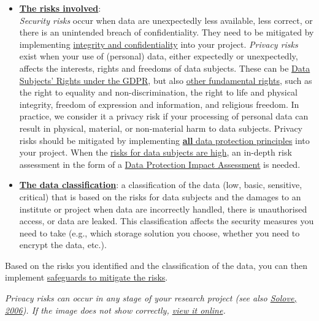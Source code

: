 \documentclass[
]{book}
\begin{document}
\begin{itemize}
\item
  \textbf{\protect\hyperlink{risk-assessment-how}{The risks involved}}:\\
  \emph{Security risks} occur when data are unexpectedly less available, less correct, or
  there is an unintended breach of confidentiality. They need to be mitigated by
  implementing \protect\hyperlink{integrity-and-confidentiality}{integrity and confidentiality} into your project.
  \emph{Privacy risks} exist when your use of (personal) data, either expectedly or
  unexpectedly, affects the interests, rights and freedoms of data subjects. These can be \protect\hyperlink{data-subject-rights}{Data Subjects' Rights under the GDPR}, but also
  \href{https://eur-lex.europa.eu/legal-content/EN/TXT/HTML/?uri=CELEX:12012P/TXT\&from=EN}{other fundamental rights},
  such as the right to equality and non-discrimination, the right to life and
  physical integrity, freedom of expression and information, and religious freedom.
  In practice, we consider it a privacy risk if your processing of personal data
  can result in physical, material, or non-material harm to data subjects. Privacy
  risks should be mitigated by implementing
  \protect\hyperlink{gdpr-principles}{\textbf{all} data protection principles} into your project.
  When the \protect\hyperlink{high-risk-processing}{risks for data subjects are high}, an in-depth
  risk assessment in the form of a \protect\hyperlink{dpia}{Data Protection Impact Assessment} is needed.
\item
  \textbf{\protect\hyperlink{data-classification}{The data classification}}: a classification of the
  data (low, basic, sensitive, critical) that is based on the risks for data
  subjects and the damages to an institute or project when data are incorrectly
  handled, there is unauthorised access, or data are leaked. This classification
  affects the security measures you need to take (e.g., which storage solution you
  choose, whether you need to encrypt the data, etc.).
\end{itemize}

Based on the risks you identified and the classification of the data, you can
then implement \protect\hyperlink{example-risks}{safeguards to mitigate the risks}.

\emph{Privacy risks can occur in any stage of your research project (see also
\href{https://scholarship.law.gwu.edu/cgi/viewcontent.cgi?article=2074\&context=faculty_publications}{Solove, 2006}).
If the image does not show correctly,
\href{https://enterprivacy.com/wp-content/uploads/2018/09/A-Taxonomy-of-Privacy.pdf}{view it online}.}
\end{document}

